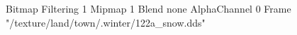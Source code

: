 {Bitmap
	{Filtering 1}
	{Mipmap 1}
	{Blend none}
	{AlphaChannel 0}
	{Frame "/texture/land/town/.winter/122a_snow.dds"}
}
